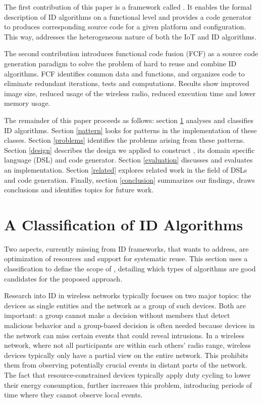 \documentclass[conference]{IEEEtran}
\begin{document}
The first contribution of this paper is a framework called \NAME. It enables
the formal description of ID algorithms on a functional level and provides a
code generator to produces corresponding source code for a given platform and
configuration. This way, \NAME addresses the heterogeneous nature of both the
IoT and ID algorithms.


The second contribution introduces functional code fusion (FCF) as a source
code generation paradigm to solve the problem of hard to reuse and combine ID
algorithms. FCF identifies common data and functions, and organizes code to
eliminate redundant iterations, tests and computations. Results show improved
image size, reduced usage of the wireless radio, reduced execution time and
lower memory usage.


The remainder of this paper proceeds as follows: section \ref{classification}
analyses and classifies ID algorithms. Section \ref{pattern} looks for patterns
in the implementation of these classes. Section \ref{problems} identifies the
problems arising from these patterns. Section \ref{design} describes the design
we applied to construct \NAME, its domain specific language (DSL) and code
generator. Section \ref{evaluation} discusses and evaluates an implementation.
Section \ref{related} explores related work in the field of DSLs and code
generation. Finally, section \ref{conclusion} summarizes our findings, draws
conclusions and identifies topics for future work.

\section{A Classification of ID Algorithms}
\label{classification}

Two aspects, currently missing from ID frameworks, that \NAME wants to address,
are optimization of resources and support for systematic reuse. This section
uses a classification to define the scope of \NAME, detailing which types of
algorithms are good candidates for the proposed approach.

Research into ID in wireless networks typically focuses on two major topics:
the devices as single entities and the network as a group of such devices. Both
are important: a group cannot make a decision without members that detect
malicious behavior and a group-based decision is often needed because devices
in the network can miss certain events that could reveal intrusions. In a
wireless network, where not all participants are within each others' radio
range, wireless devices typically only have a partial view on the entire
network. This prohibits them from observing potentially crucial events in
distant parts of the network. The fact that resource-constrained devices
typically apply duty cycling to lower their energy consumption, further
increases this problem, introducing periods of time where they cannot observe
local events.
\end{document}
